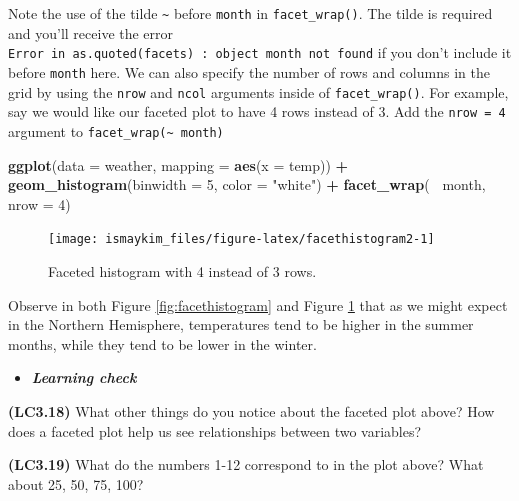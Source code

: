 \documentclass[12pt, krantz2,]{krantz}
\makeatletter
\newenvironment{Shaded}{\begin{snugshade}}{\end{snugshade}}
\newcommand{\DataTypeTok}[1]{\textcolor[rgb]{0.27,0.27,0.27}{#1}}
\newcommand{\DecValTok}[1]{\textcolor[rgb]{0.06,0.06,0.06}{#1}}
\newcommand{\KeywordTok}[1]{\textcolor[rgb]{0.27,0.27,0.27}{\textbf{#1}}}
\newcommand{\NormalTok}[1]{#1}
\newcommand{\OperatorTok}[1]{\textcolor[rgb]{0.43,0.43,0.43}{\textbf{#1}}}
\newcommand{\StringTok}[1]{\textcolor[rgb]{0.5,0.5,0.5}{#1}}
\newenvironment{kframe}{%
\medskip{}
\setlength{\fboxsep}{.8em}
 \def\at@end@of@kframe{}%
 \ifinner\ifhmode%
  \def\at@end@of@kframe{\end{minipage}}%
  \begin{minipage}{\columnwidth}%
 \fi\fi%
 \def\FrameCommand##1{\hskip\@totalleftmargin \hskip-\fboxsep
 \colorbox{shadecolor}{##1}\hskip-\fboxsep
     \hskip-\linewidth \hskip-\@totalleftmargin \hskip\columnwidth}%
 \MakeFramed {\advance\hsize-\width
   \@totalleftmargin\z@ \linewidth\hsize
   \@setminipage}}%
 {\par\unskip\endMakeFramed%
 \at@end@of@kframe}
\renewenvironment{Shaded}{\begin{kframe}}{\end{kframe}}
\newenvironment{rmdblock}[1]
  {\begin{shaded*}
  \begin{itemize}
  \renewcommand{\labelitemi}{
    \raisebox{-.7\height}[0pt][0pt]{
    }
  }
  \item
  }
  {
  \end{itemize}
  \end{shaded*}
  }
\newenvironment{learncheck}
  {\begin{rmdblock}{warning}}
  {\end{rmdblock}}
\makeatother
\begin{document}
Note the use of the tilde \texttt{\textasciitilde{}} before \texttt{month} in \texttt{facet\_wrap()}. The tilde is required and you'll receive the error \texttt{Error\ in\ as.quoted(facets)\ :\ object\ \textquotesingle{}month\textquotesingle{}\ not\ found} if you don't include it before \texttt{month} here. We can also specify the number of rows and columns in the grid by using the \texttt{nrow} and \texttt{ncol} arguments inside of \texttt{facet\_wrap()}. For example, say we would like our faceted plot to have 4 rows instead of 3. Add the \texttt{nrow\ =\ 4} argument to \texttt{facet\_wrap(\textasciitilde{}\ month)}

\begin{Shaded}
\begin{Highlighting}[]
\KeywordTok{ggplot}\NormalTok{(}\DataTypeTok{data =}\NormalTok{ weather, }\DataTypeTok{mapping =} \KeywordTok{aes}\NormalTok{(}\DataTypeTok{x =}\NormalTok{ temp)) }\OperatorTok{+}
\StringTok{  }\KeywordTok{geom_histogram}\NormalTok{(}\DataTypeTok{binwidth =} \DecValTok{5}\NormalTok{, }\DataTypeTok{color =} \StringTok{"white"}\NormalTok{) }\OperatorTok{+}
\StringTok{  }\KeywordTok{facet_wrap}\NormalTok{(}\OperatorTok{~}\StringTok{ }\NormalTok{month, }\DataTypeTok{nrow =} \DecValTok{4}\NormalTok{)}
\end{Highlighting}
\end{Shaded}

\begin{figure}

{\centering \texttt{[image: ismaykim\_files/figure-latex/facethistogram2-1]} 

}

\caption{Faceted histogram with 4 instead of 3 rows.}\label{fig:facethistogram2}
\end{figure}

Observe in both Figure \ref{fig:facethistogram} and Figure \ref{fig:facethistogram2} that as we might expect in the Northern Hemisphere, temperatures tend to be higher in the summer months, while they tend to be lower in the winter.

\begin{learncheck}
\textbf{\emph{Learning check}}
\end{learncheck}

\textbf{(LC3.18)} What other things do you notice about the faceted plot above? How does a faceted plot help us see relationships between two variables?

\textbf{(LC3.19)} What do the numbers 1-12 correspond to in the plot above? What about 25, 50, 75, 100?
\end{document}
